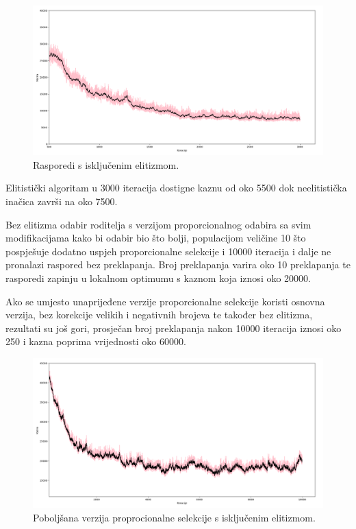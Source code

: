 \documentclass[times, utf8, zavrsni]{fer}
\begin{document}
\begin{figure}[htb]
\centering
\includegraphics[width=14cm]{images/usp_elitizam_ne.png}
\caption{Rasporedi s isključenim elitizmom.}
\label{fig:usp_elitizam_ne}
\end{figure}

Elitistički algoritam u 3000 iteracija dostigne kaznu od oko 5500 dok neelitistička inačica završi na oko 7500.

Bez elitizma odabir roditelja s verzijom proporcionalnog odabira sa svim modifikacijama  kako bi odabir bio što bolji, populacijom veličine 10 što pospješuje dodatno uspjeh proporcionalne selekcije i 10000 iteracija i dalje ne pronalazi raspored bez preklapanja. Broj preklapanja varira oko 10 preklapanja te rasporedi zapinju u lokalnom optimumu s kaznom koja iznosi oko 20000.

Ako se umjesto unaprijeđene verzije proporcionalne selekcije koristi osnovna verzija, bez korekcije velikih i negativnih brojeva te također bez elitizma, rezultati su još gori, prosječan broj preklapanja nakon 10000 iteracija iznosi oko 250 i kazna poprima vrijednosti oko 60000.

\begin{figure}[htb]
\centering
\includegraphics[width=14cm]{images/proporcije_e_ne.png}
\caption{Poboljšana verzija proprocionalne selekcije s isključenim elitizmom.}
\label{fig:prop_e_ne}
\end{figure}
\end{document}
